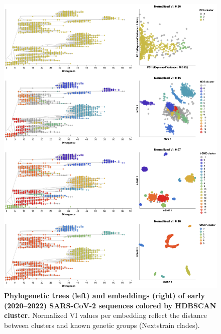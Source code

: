 \documentclass[10pt,letterpaper]{article}
\begin{document}
\begin{figure}[!h]
\includegraphics[width=\columnwidth]{figures/sarscov2-embeddings-by-cluster-vs-Nextstrain_clade.png}
\caption{{\bf Phylogenetic trees (left) and embeddings (right) of early (2020--2022) SARS-CoV-2 sequences colored by HDBSCAN cluster.}
  Normalized VI values per embedding reflect the distance between clusters and known genetic groups (Nextstrain clades).
}
\label{fig:sars-cov-2-2020-2022-clusters-vs-Nextstrain-clade}
\end{figure}
\end{document}
